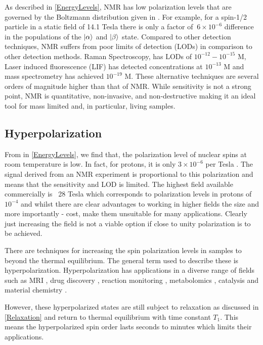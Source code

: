 As described in \ref{EnergyLevels}, NMR has low polarization levels that are governed by the Boltzmann
distribution given in . For example, for a spin-1/2 particle in a static field of 14.1 Tesla
there is only a factor of $~6\times10^{-6}$ difference in the populations of the $\ket{\alpha}$ and $\ket{\beta}$ state.
Compared to other detection techniques, NMR suffers from poor limits of detection (LODs)
in comparison to other detection methods. Raman Spectroscopy, has
LODs of $10^{-12} - 10^{-15}$ M, Laser induced fluorescence (LIF) has detected concentrations at $10^{-13}$ M and
mass spectrometry has achieved $10^{-19}$ M. These alternative techniques are several orders of magnitude higher than that of NMR.
While sensitivity is not a strong point, NMR is quantitative, non-invasive, and non-destructive making it an ideal
tool for mass limited and, in particular, living samples.

\subsection{Hyperpolarization}

 From  in \ref{EnergyLevels}, we find that, the polarization level of nuclear spins at room temperature is low. In fact,
 for protons, it is only $3\times10^{-6}$ per Tesla \citep{RN138}. The signal derived from an NMR experiment
 is proportional to this polarization and means that the sensitivity and LOD is limited. The highest
 field available commercially is ~28 Tesla which corresponds to polarization levels in protons of ~$10^{-4}$ and
 whilst there are clear advantages to working in higher fields the size and more importantly - cost, make them
 unsuitable for many applications. Clearly just increasing the field is not a viable
 option if close to unity polarization is to be
 achieved.

 There are techniques for increasing the spin polarization levels in samples to beyond the thermal
 equilibrium. The general term used to describe these is hyperpolarization. Hyperpolarization has
 applications in a diverse range of fields such as MRI \citep{RN139,RN140,RN151,RN152}, drug discovery
 \citep{RN141,RN142}, reaction monitoring \citep{RN143,RN144,RN145}, metabolomics \citep{RN147,RN148},
 catalysis\citep{RN149, RN150} and material chemistry \citep{RN153,piveteau2015structure,RN154}.

 However, these hyperpolarized states are still subject to relaxation as discussed in \ref{Relaxation} and
 return to thermal equilibrium with time constant $T_1$. This means the hyperpolarized spin order lasts seconds
 to minutes which limits their applications.

